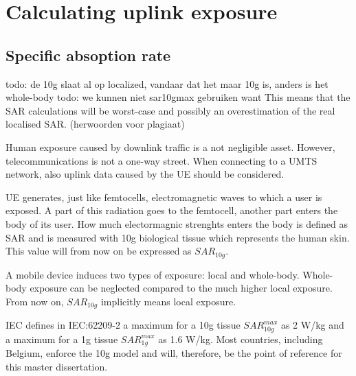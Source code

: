 



\section{Calculating uplink exposure}
\subsection{Specific absoption rate}
\label{sec:sar}

todo: de 10g slaat al op localized, vandaar dat het maar 10g is, anders is het whole-body
todo: we kunnen niet sar10gmax gebruiken want This means that the SAR calculations will be worst-case and possibly an overestimation of the real localised SAR. (herwoorden voor plagiaat)

Human exposure caused by downlink traffic is a not negligible asset. However, telecommunications is not a one-way street. When connecting to a UMTS network, also uplink data caused by the \gls{UE} should be considered.

\gls{UE} generates, just like femtocells, electromagnetic waves to which a user is exposed. A part of this radiation goes to the femtocell, another part enters the body of its user. How much electormagnic strenghts enters the body is defined as \gls{SAR} and is measured with 10g biological tissue which represents the human skin. This value will from now on be expressed as $SAR_{10g}$. 

A mobile device induces two types of exposure: local and whole-body. Whole-body exposure can be neglected compared to the much higher local exposure\cite{j10.1.1_gati2010duality}.  From now on, $SAR_{10g}$ implicitly means local exposure.

\gls{IEC} defines in IEC:62209-2 a maximum for a 10g tissue $SAR^{max}_{10g}$ as 2 W/kg and a maximum for a 1g tissue $SAR^{max}_{1g}$ as 1.6 W/kg. Most countries, including Belgium, enforce the 10g model and will, therefore, be the point of reference for this master dissertation.

